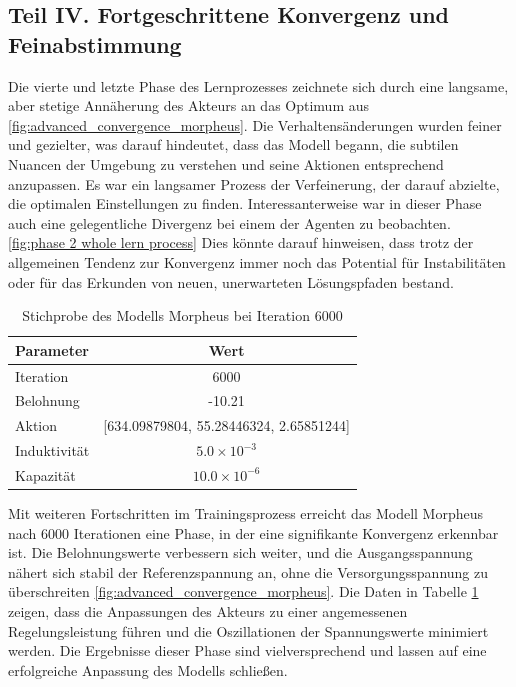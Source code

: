 \subsection{Teil IV. Fortgeschrittene Konvergenz und Feinabstimmung}
\label{subsec:Advanced_Convergence_and_Fine_Tuning}


Die vierte und letzte Phase des Lernprozesses zeichnete sich durch eine langsame, aber stetige Annäherung des Akteurs an das Optimum aus \ref{fig:advanced_convergence_morpheus}. Die Verhaltensänderungen wurden feiner und gezielter, was darauf hindeutet, dass das Modell begann, die subtilen Nuancen der Umgebung zu verstehen und seine Aktionen entsprechend anzupassen. Es war ein langsamer Prozess der Verfeinerung, der darauf abzielte, die optimalen Einstellungen zu finden. Interessanterweise war in dieser Phase auch eine gelegentliche Divergenz bei einem der Agenten zu beobachten. \ref{fig:phase 2 whole lern process} Dies könnte darauf hinweisen, dass trotz der allgemeinen Tendenz zur Konvergenz immer noch das Potential für Instabilitäten oder für das Erkunden von neuen, unerwarteten Lösungspfaden bestand.


\begin{table}[htbp]
\centering
\caption{Stichprobe des Modells Morpheus bei Iteration 6000}
\label{tab:sample_morpheus_6000}
\begin{tabular}{l c}
\hline
\textbf{Parameter} & \textbf{Wert} \\
\hline
Iteration & 6000 \\
Belohnung & -10.21 \\
Aktion & [634.09879804, 55.28446324, 2.65851244] \\
Induktivität & \( 5.0 \times 10^{-3} \) \\
Kapazität & \( 10.0 \times 10^{-6} \) \\
\hline
\end{tabular}
\end{table}

Mit weiteren Fortschritten im Trainingsprozess erreicht das Modell Morpheus nach 6000 Iterationen eine Phase, in der eine signifikante Konvergenz erkennbar ist. Die Belohnungswerte verbessern sich weiter, und die Ausgangsspannung nähert sich stabil der Referenzspannung an, ohne die Versorgungsspannung zu überschreiten \ref{fig:advanced_convergence_morpheus}. Die Daten in Tabelle \ref{tab:sample_morpheus_6000} zeigen, dass die Anpassungen des Akteurs zu einer angemessenen Regelungsleistung führen und die Oszillationen der Spannungswerte minimiert werden. Die Ergebnisse dieser Phase sind vielversprechend und lassen auf eine erfolgreiche Anpassung des Modells schließen.

